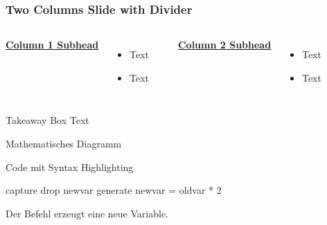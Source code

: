 \begin{frame}[t]
\frametitle{Two Columns Slide with Divider}
\begin{columns}[T]
\underline{\textbf{Column 1 Subhead}}
\begin{itemize}
\item Text
\item Text
\end{itemize}

\centering
\rule{0.5pt}{4cm} %

\underline{\textbf{Column 2 Subhead}}
\begin{itemize}
\item Text
\item Text
\end{itemize}
\end{columns}
\vfill
\begin{block}{Takeaway Box}
Text
\end{block}
\vfill
\end{frame}

\begin{frame}{Mathematisches Diagramm}
\end{frame}


\begin{frame}[fragile]{Code mit Syntax Highlighting}
\begin{stata}
capture drop newvar
generate newvar = oldvar * 2
\end{stata}
Der Befehl  erzeugt eine neue Variable.

\end{frame}

